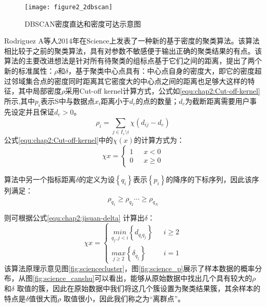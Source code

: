 \begin{figure}[h]
\centering
\texttt{[image: figure2\_2dbscan]}
\caption{DBSCAN密度直达和密度可达示意图}
\label{fig:figure2_2dbscan}
\end{figure}
\par Rodriguez A等人2014年在Science上发表了一种新的基于密度的聚类算法。该算法相比较于之前的聚类算法，具有对参数不敏感便于输出正确的聚类结果的有点。该算法的主要改进想法是针对所有待聚类的组标点基于它们之间的距离，提出了两个新的标准属性：$\rho$和$\delta$，基于聚类中心点具有：中心点自身的密度大，即它的密度超过邻域集合点的密度同时距离其它密度大的中心点之间的距离也足够大这样的特征，其中局部密度$\rho$采用Cut-off kernel计算方式，公式如\ref{equ:chap2:Cut-off-kernel}所示,其中$p_{i}$表示S中与数据点$x_{i}$距离小于$d_{c}$的点的数量；$d_{c}$为截断距离需要用户事先设定并且保证$d_{c} >0$。
\begin{equation}
\label{equ:chap2:Cut-off-kernel}
\rho_{i}=\sum_{j \in I_{s}\setminus {i}}^{ }\chi (d_{ij}-d_{c})
\end{equation}
公式\ref{equ:chap2:Cut-off-kernel}中的$\chi(x)$的计算方式为：
\begin{equation}
\label{equ:chap2:chi-kernel}
\chi{x}=
\begin{cases}
1 & \mbox { $x<0$}\\
0 & \mbox { $x \geq  0$}
\end{cases}
\end{equation}
\par 算法中另一个指标距离$\delta$的定义为设$\left \{  q_{i} \right \}$表示$\left \{  p_{i} \right \}$的降序的下标序列，因此该序列满足：
\begin{equation}
\label{equ:chap2:se-delta}
\rho_{q_{1}} \geq \rho_{q_{2}} \cdots \geq \rho_{q_{N}}
\end{equation}
\par 则可根据公式\ref{equ:chap2:jisuan-delta} 计算出$\delta$：
\begin{equation}
\label{equ:chap2:jisuan-delta}
\chi{x}=
\begin{cases}
\underset{q_{j},j<i}{min} \left \{ d_{q_{i}q_{j}} \right \}  & \mbox { $i \geq 2$}\\
\underset{j\geq 2}{max} \left \{ \delta_{q_{j}} \right \} & \mbox { $i=1$}
\end{cases}
\end{equation}
该算法原理示意见图\ref{fig:sciencecluster}，图\ref{fig:science_p}展示了样本数据的概率分布，从图\ref{fig:science_canshu}可以看出，能够从原始数据中找出几个具有较大的$\rho$和$\delta$ 取值的簇，因此在原始数据中我们将这几个簇设置为聚类结果簇，其余样本的特点是$\delta$值很大而$\rho$ 取值很小，因此我们称之为“离群点”。
